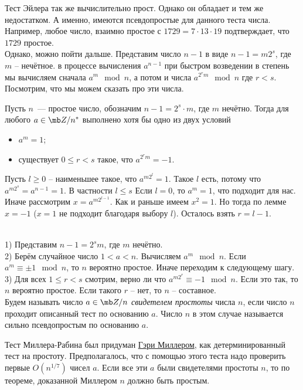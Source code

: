 Тест Эйлера так же вычислительно прост. Однако он обладает и тем же недостатком. А именно, имеются псевдопростые для данного теста числа. Например, любое число, взаимно простое с  $1729=7\cdot 13\cdot 19$ подтверждает, что $1729$ простое.\\



Однако, можно пойти дальше. Представим число  $n-1$ в виде $n-1=m2^s$, где $m$ -- нечётное. в процессе вычисления $a^{n-1}$ при быстром возведении в степень мы вычисляем сначала $a^m \mod n$, а потом и числа $a^{2^r m}\mod n$ где $r<s$. Посмотрим, что мы можем  сказать про эти числа.

\thrm
Пусть $n$~--- простое число, обозначим $n-1=2^s\cdot m$, где $m$ нечётно. Тогда для любого $a\in\mb Z/n^*$ выполнено хотя бы одно из двух условий
\begin{itemize}
\item 
$a^m=1$;
\item
существует $0\leqslant r<s$ такое, что $a^{2^rm}=-1$.
\end{itemize}
\ethrm
\proof Пусть $l \geq 0$ -- наименьшее такое, что $a^{m2^l}= 1$. Такое $l$ есть, потому что $a^{m2^s}=a^{n-1}=1$. В частности $l\leq s$ Если $l=0$, то $a^m=1$, что подходит для нас. Иначе рассмотрим $x=a^{m2^{l-1}}$. Как и раньше имеем $x^2=1$. Но тогда по лемме $x=- 1$ ($x=1$ не подходит благодаря выбору $l$). Осталось взять $r=l-1$.
\endproof



 \\
1) Представим $n-1=2^sm$, где $m$ нечётно.\\
2) Берём случайное число $1<a<n$. Вычисляем $a^m \mod n$. Если $a^{m}\equiv \pm 1\mod n$, то $n$ вероятно простое. Иначе переходим к следующему шагу.\\
3) Для всех $1\leq r<s$ смотрим, верно ли что $a^{m2^r}\equiv -1 \mod n$. Если это так, то $n$ вероятно простое. Если такого $r$ -- нет, то $n$ -- составное.\\

\dfn Будем называть число $a\in\mb Z/n$ {\it свидетелем простоты} числа $n$, если число $n$ проходит описанный тест по основанию $a$. Число $n$ в этом случае называется сильно псевдопростым по основанию $a$.
\edfn

Тест Миллера-Рабина был придуман \href{https://www.cs.cmu.edu/~glmiller/Publications/Papers/Mi76.pdf}{Гэри Миллером}, как детерминированный тест на простоту. Предполагалось, что с помощью этого теста надо проверить первые $O(n^{1/7})$ чисел $a$. Если все эти $a$ были свидетелями простоты $n$, то по теореме, доказанной Миллером $n$ должно быть простым.

